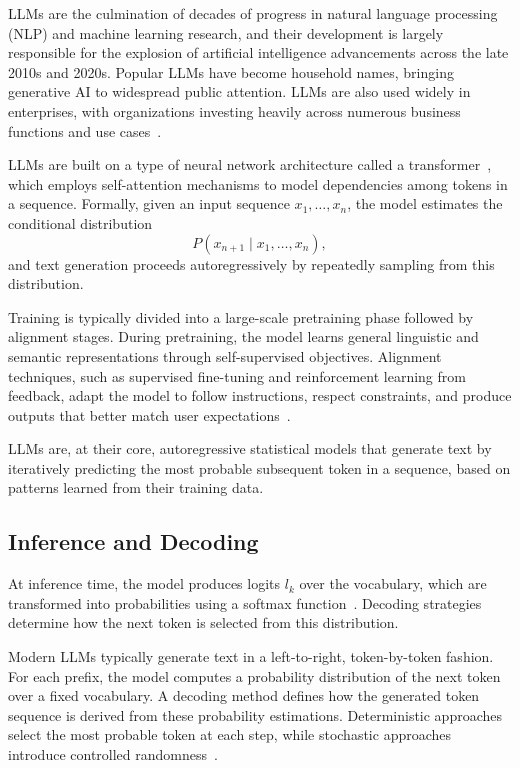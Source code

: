 \documentclass[../../main]{subfiles}
\begin{document}
LLMs are the culmination of decades of progress in natural language processing (NLP) and machine learning research, and their development is largely responsible for the explosion of artificial intelligence advancements across the late 2010s and 2020s. Popular LLMs have become household names, bringing generative AI to widespread public attention. LLMs are also used widely in enterprises, with organizations investing heavily across numerous business functions and use cases~\cite{LLMsIBM}.

LLMs are built on a type of neural network architecture called a transformer~\cite{TransformerArchitecture}, which employs self-attention mechanisms to model dependencies among tokens in a sequence. Formally, given an input sequence \(x_1, \dots, x_n\), the model estimates the conditional distribution
\[
P(x_{n+1} \mid x_1, \dots, x_n),
\]
and text generation proceeds autoregressively by repeatedly sampling from this distribution.

Training is typically divided into a large-scale pretraining phase followed by alignment stages. During pretraining, the model learns general linguistic and semantic representations through self-supervised objectives. Alignment techniques, such as supervised fine-tuning and reinforcement learning from feedback, adapt the model to follow instructions, respect constraints, and produce outputs that better match user expectations~\cite{LLMsIBM}.

LLMs are, at their core, autoregressive statistical models that generate text by iteratively predicting the most probable subsequent token in a sequence, based on patterns learned from their training data.

\subsection{Inference and Decoding}

At inference time, the model produces logits \(l_k\) over the vocabulary, which are transformed into probabilities using a softmax function~\cite{InfeerenceTrainingLLMs}. Decoding strategies determine how the next token is selected from this distribution.

Modern LLMs typically generate text in a left-to-right, token-by-token fashion. For each prefix, the model computes a probability distribution of the next token over a fixed vocabulary. A decoding method defines how the generated token sequence is derived from these probability estimations. Deterministic approaches select the most probable token at each step, while stochastic approaches introduce controlled randomness~\cite{LLMDecoding}.
\end{document}
